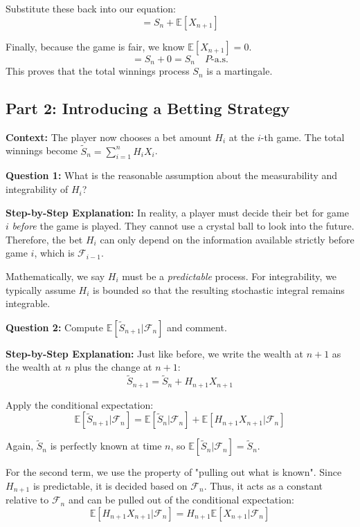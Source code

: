 Substitute these back into our equation:
\[ = S_n + \mathbb{E}[X_{n+1}] \]

Finally, because the game is fair, we know $\mathbb{E}[X_{n+1}] = 0$. 
\[ = S_n + 0 = S_n \quad P\text{-a.s.} \]
This proves that the total winnings process $S_n$ is a martingale.

\subsection{Part 2: Introducing a Betting Strategy}

\textbf{Context:} The player now chooses a bet amount $H_i$ at the $i$-th game. The total winnings become $\tilde{S}_n = \sum_{i=1}^n H_i X_i$.

\textbf{Question 1:} What is the reasonable assumption about the measurability and integrability of $H_i$?

\textbf{Step-by-Step Explanation:}
In reality, a player must decide their bet for game $i$ \textit{before} the game is played. They cannot use a crystal ball to look into the future. Therefore, the bet $H_i$ can only depend on the information available strictly before game $i$, which is $\mathcal{F}_{i-1}$. 

Mathematically, we say $H_i$ must be a \textit{predictable} process. For integrability, we typically assume $H_i$ is bounded so that the resulting stochastic integral remains integrable.

\vspace{0.5cm}
\textbf{Question 2:} Compute $\mathbb{E}[\tilde{S}_{n+1} | \mathcal{F}_n]$ and comment.

\textbf{Step-by-Step Explanation:}
Just like before, we write the wealth at $n+1$ as the wealth at $n$ plus the change at $n+1$:
\[ \tilde{S}_{n+1} = \tilde{S}_n + H_{n+1} X_{n+1} \]

Apply the conditional expectation:
\[ \mathbb{E}[\tilde{S}_{n+1} | \mathcal{F}_n] = \mathbb{E}[\tilde{S}_n | \mathcal{F}_n] + \mathbb{E}[H_{n+1} X_{n+1} | \mathcal{F}_n] \]

Again, $\tilde{S}_n$ is perfectly known at time $n$, so $\mathbb{E}[\tilde{S}_n | \mathcal{F}_n] = \tilde{S}_n$.

For the second term, we use the property of "pulling out what is known". Since $H_{n+1}$ is predictable, it is decided based on $\mathcal{F}_n$. Thus, it acts as a constant relative to $\mathcal{F}_n$ and can be pulled out of the conditional expectation:
\[ \mathbb{E}[H_{n+1} X_{n+1} | \mathcal{F}_n] = H_{n+1} \mathbb{E}[X_{n+1} | \mathcal{F}_n] \]

